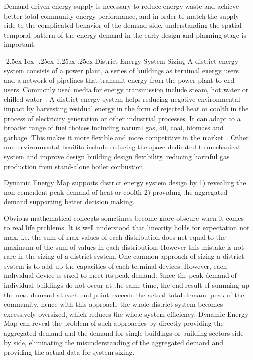 \documentclass[hidelinks,12pt]{article}
\makeatletter
\renewcommand\paragraph{\@startsection{paragraph}{4}{\z@}%
            {-2.5ex\@plus -1ex \@minus -.25ex}%
            {1.25ex \@plus .25ex}%
            {\normalfont\normalsize\bfseries}}
\makeatother
\begin{document}
Demand-driven energy supply is necessary to reduce energy waste and
achieve better total community energy performance, and in order to
match the supply side to the complicated behavior of the demand side,
understanding the spatial-temporal pattern of the energy demand 
in the early design and planning stage is important. 

\paragraph{District Energy System Sizing}
A district energy system consists of a power plant, a series of
buildings as ternimal energy users and a network of pipelines that
transmit energy from the power plant to end-users. Commonly used media
for energy transmission include steam, hot water or chilled
water~\cite{baird2014}. A district energy system helps reducing
negative environmental impact by harvesting residual energy in the
form of rejected heat or coolth in the process of electricity
generation or other industrial processes. It can adapt to a broader
range of fuel choices including natural gas, oil, coal, biomass and
garbage. This makes it more flexible and more competitive in the
market~\cite{IDEA2005}. Other non-environmental benifits include
reducing the space dedicated to mechanical system and improve design
building design flexibility, reducing harmful gas production from
stand-alone boiler conbustion.

Dynamic Energy Map supports district energy system design by 1)
revealing the non-coincident peak demand of heat or coolth 2)
providing the aggregated demand supporting better decision making.

Obvious mathematical concepts sometimes become more obscure when it
comes to real life problems. It is well understood that linearity
holds for expectation not max, i.e. the sum of max values of each
distribution does not equal to the maximum of the sum of values in
each distribution. However this mistake is not rare in the sizing of a
district system. One common approach of sizing a district system is to
add up the capacities of each terminal devices. However, each
individual device is sized to meet its peak demand. Since the peak
demand of individual buildings do not occur at the same time, the end
result of summing up the max demand at each end point exceeds the
actual total demand peak of the community, hence with this approach,
the whole district system becomes excessively oversized, which reduces
the whole system efficiency. Dynamic Energy Map can reveal the problem
of such approaches by directly providing the aggregated demand and the
demand for single buildings or building sectors side by side,
eliminating the misunderstanding of the aggregated demand and
providing the actual data for system sizing.
\end{document}
